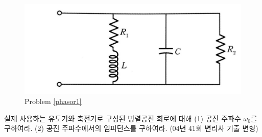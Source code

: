 \begin{problem}\label{phasor1}
\begin{figure}[h]
\centering\includegraphics[scale=0.20]{Pictures/phasor1.jpg}
\caption{Problem \ref{phasor1}}
\end{figure}
실제 사용하는 유도기와 축전기로 구성된 병렬공진 회로에 대해 (1) 공진 주파수 $\omega_0$를 구하여라. (2) 공진 주파수에서의 임피던스를 구하여라.
(04년 41회 변리사 기출 변형)
\end{problem}

